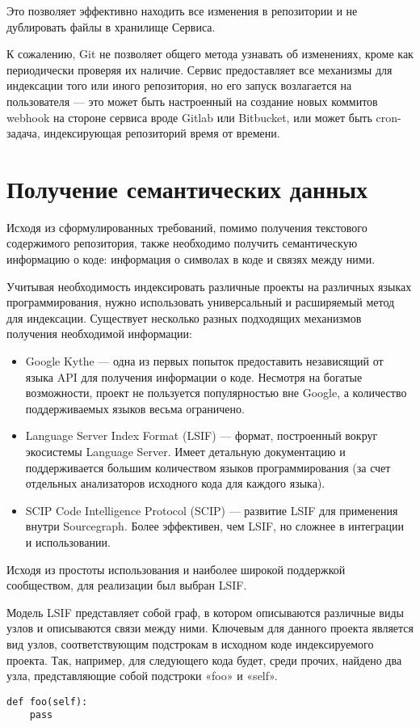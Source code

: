 Это позволяет эффективно находить все изменения в репозитории и не дублировать файлы в хранилище Сервиса.

К сожалению, Git не позволяет общего метода узнавать об изменениях, кроме как периодически проверяя их наличие. Сервис предоставляет все механизмы для индексации того или иного репозитория, но его запуск возлагается на пользователя — это может быть настроенный на создание новых коммитов webhook на стороне сервиса вроде Gitlab или Bitbucket, или может быть cron-задача, индексирующая репозиторий время от времени.

\section{Получение семантических данных}

Исходя из сформулированных требований, помимо получения текстового содержимого репозитория, также необходимо получить семантическую информацию о коде: информация о символах в коде и связях между ними.

Учитывая необходимость индексировать различные проекты на различных языках программирования, нужно использовать универсальный и расширяемый метод для индексации. Существует несколько разных подходящих механизмов получения необходимой информации:

\begin{itemize}
    \item Google Kythe \cite{Kythe} — одна из первых попыток предоставить независящий от языка API для получения информации о коде. Несмотря на богатые возможности, проект не пользуется популярностью вне Google, а количество поддерживаемых языков весьма ограничено.
    \item Language Server Index Format (LSIF) \cite{lsif} — формат, построенный вокруг экосистемы Language Server. Имеет детальную документацию и поддерживается большим количеством языков программирования (за счет отдельных анализаторов исходного кода для каждого языка).
    \item SCIP Code Intelligence Protocol (SCIP) \cite{scip} — развитие LSIF для применения внутри Sourcegraph. Более эффективен, чем LSIF, но сложнее в интеграции и использовании.
\end{itemize}

Исходя из простоты использования и наиболее широкой поддержкой сообществом, для реализации был выбран \gls{LSIF}.

Модель \gls{LSIF} представляет собой граф, в котором описываются различные виды узлов и описываются связи между ними. Ключевым для данного проекта является вид узлов, соответствующим подстрокам в исходном коде индексируемого проекта. Так, например, для следующего кода будет, среди прочих, найдено два узла, представляющие собой подстроки «foo» и «self».
\begin{verbatim}
def foo(self):
    pass
\end{verbatim}

